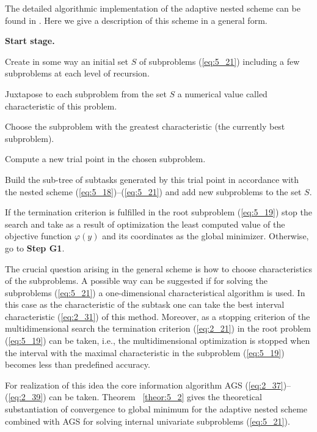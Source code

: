 The detailed algorithmic implementation of the adaptive nested scheme can be found in \cite{5_GerGriGer}. Here we give a description of this scheme in a general form.

\textbf{Start stage.}

Create in some way an initial set $S$  of subproblems (\ref{eq:5_21}) including a few subproblems at each level of recursion.
\begin{description} 
\item [\textbf{Step G1.}] {Juxtapose to each subproblem from the set $S$ a numerical value called characteristic of this problem.}
\item [\textbf{Step G2.}] {Choose the subproblem with the greatest characteristic (the currently best subproblem).}
\item [\textbf{Step G3.}]{Compute a new trial point in the chosen subproblem.}
\item [\textbf{Step G4.}]{Build the sub-tree of subtasks generated by this trial point in accordance with the nested scheme  (\ref{eq:5_18})--(\ref{eq:5_21}) and add new subproblems to the set $S$.}
\item [\textbf{Step G5.}]{If the termination  criterion is fulfilled in the root subproblem (\ref{eq:5_19}) stop the search and take as a result of optimization the least computed value of the objective function $\varphi(y)$ and its coordinates as the global minimizer. Otherwise, go to \textbf{Step G1}.}
\end{description}

The crucial question arising in the general scheme is how to choose characteristics of the subproblems.  A possible way can be suggested if for solving the subproblems (\ref{eq:5_21}) a one-dimensional characteristical algorithm is used. In this case as the characteristic of the subtask one can take the best interval characteristic (\ref{eq:2_31}) of this method. Moreover, as a stopping criterion of the multidimensional search the termination criterion (\ref{eq:2_21}) in the root problem (\ref{eq:5_19}) can be taken, i.e., the multidimensional optimization is stopped when the interval with the maximal characteristic in the subproblem (\ref{eq:5_19}) becomes less than predefined accuracy. 

For realization of this idea the core information  algorithm AGS (\ref{eq:2_37})--(\ref{eq:2_39}) can be taken. Theorem ~\ref{theor:5_2} gives the theoretical substantiation of convergence to global minimum for the adaptive nested scheme combined with AGS for solving internal univariate subproblems (\ref{eq:5_21}).

